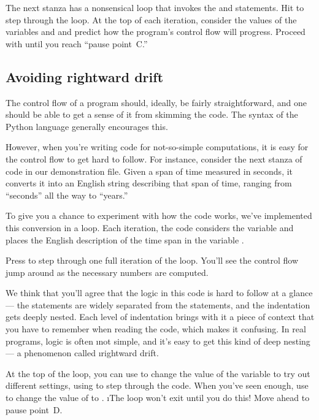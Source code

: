 \documentclass[letterpaper, 12pt, titlepage, twoside]{article}
\begin{document}
The next stanza has a nonsensical  loop that invokes the  and
 statements. \typeit Hit  to step through the loop. At the
top of each iteration, consider the values of the variables  and 
and predict how the program's control flow will progress. \typeit Proceed with
 until you reach ``pause point~C.''

\subsection*{Avoiding rightward drift}

The control flow of a program should, ideally, be fairly straightforward, and
one should be able to get a sense of it from skimming the code. The syntax of
the Python language generally encourages this.

However, when you're writing code for not-so-simple computations, it is easy
for the control flow to get hard to follow. For instance, consider the next
stanza of code in our demonstration file. Given a span of time measured in
seconds, it converts it into an English string describing that span of time,
ranging from ``seconds'' all the way to ``years.''

To give you a chance to experiment with how the code works, we've implemented
this conversion in a loop. Each iteration, the code considers the variable
 and places the English description of the time span in the
variable .

\typeit Press  to step through one full iteration of the loop. You'll see
the control flow jump around as the necessary numbers are computed.

We think that you'll agree that the logic in this code is hard to follow at a
glance --- the  statements are widely separated from the 
statements, and the indentation gets deeply nested. Each level of indentation
brings with it a piece of context that you have to remember when reading the
code, which makes it confusing. In real programs, logic is often \i{not}
simple, and it's easy to get this kind of deep nesting --- a phenomenon called
\i{rightward drift}.

\typeit At the top of the loop, you can use  to change the value
of the  variable to try out different settings, using  to step
through the code. When you've seen enough, use  to change the
value of  to . \i{The loop won't exit until you do
  this!} Move ahead to pause point~D.
\end{document}
